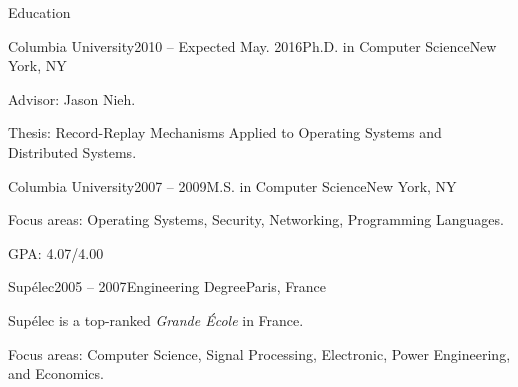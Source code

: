 \documentclass{resume} %
\newcommand{\columbia}{{Columbia University}\xspace}
\newcommand{\supelec}{{Sup\'{e}lec}\xspace}
\newcommand{\eiffel}{{Lyc\'{e}e Gustave Eiffel}\xspace}
\begin{document}
\vspace{-1em}


\begin{rSection}{Education}

\begin{rSubsection}{\columbia}{2010 -- Expected May. 2016}{Ph.D. in Computer Science}{New York, NY}
\item Advisor: Jason Nieh.
\item Thesis: Record-Replay Mechanisms Applied to Operating Systems and Distributed Systems.
\end{rSubsection}

\begin{rSubsection}{\columbia}{2007 -- 2009}{M.S. in Computer Science}{New York, NY}
\item Focus areas: Operating Systems, Security, Networking, Programming Languages.
\item GPA: 4.07/4.00
\end{rSubsection}

\begin{rSubsection}{\supelec}{2005 -- 2007}{Engineering Degree}{Paris, France}
\item \supelec is a top-ranked {\em Grande \'{E}cole} in France.
\item Focus areas: Computer Science, Signal Processing, Electronic, Power Engineering, and Economics.
\end{rSubsection}


\end{rSection}

\end{document}
